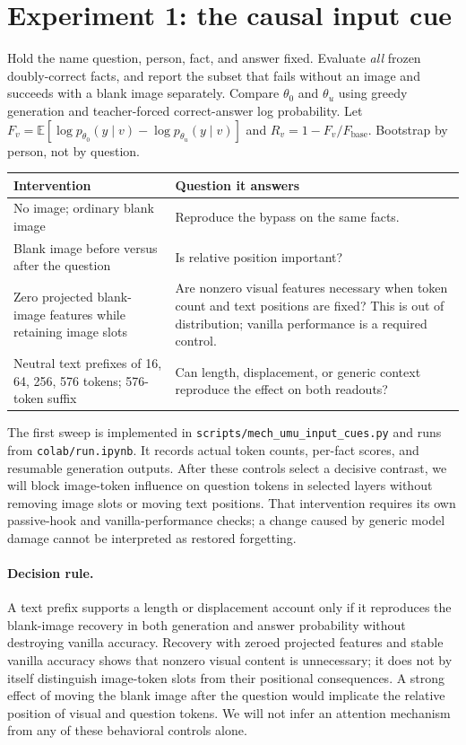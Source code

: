 \documentclass[11pt]{article}
\newcommand{\thu}{\theta_u}
\newcommand{\tho}{\theta_0}
\begin{document}
\section{Experiment 1: the causal input cue}
\label{sec:cue}
Hold the name question, person, fact, and answer fixed. Evaluate \emph{all} frozen
doubly-correct facts, and report the subset that fails without an image and succeeds
with a blank image separately. Compare $\tho$ and $\thu$ using greedy generation
and teacher-forced correct-answer log probability. Let
$F_v=\mathbb{E}[\log p_{\tho}(y\mid v)-\log p_{\thu}(y\mid v)]$ and
$R_v=1-F_v/F_{\mathrm{base}}$. Bootstrap by person, not by question.

\begin{center}\small
\begin{tabularx}{\linewidth}{@{}lX@{}}
\toprule
Intervention & Question it answers\\
\midrule
No image; ordinary blank image & Reproduce the bypass on the same facts.\\
Blank image before versus after the question & Is relative position important?\\
Zero projected blank-image features while retaining image slots & Are nonzero visual features necessary when token count and text positions are fixed? This is out of distribution; vanilla performance is a required control.\\
Neutral text prefixes of 16, 64, 256, 576 tokens; 576-token suffix & Can length, displacement, or generic context reproduce the effect on both readouts?\\
\bottomrule
\end{tabularx}
\end{center}
The first sweep is implemented in \texttt{scripts/mech\_umu\_input\_cues.py} and
runs from \texttt{colab/run.ipynb}. It records actual token counts, per-fact scores,
and resumable generation outputs. After these controls select a decisive contrast,
we will block image-token influence on question tokens in selected layers without
removing image slots or moving text positions. That intervention requires its own
passive-hook and vanilla-performance checks; a change caused by generic model damage
cannot be interpreted as restored forgetting.

\paragraph{Decision rule.} A text prefix supports a length or displacement account
only if it reproduces the blank-image recovery in both generation and answer probability
without destroying vanilla accuracy. Recovery with zeroed projected features and stable
vanilla accuracy shows that nonzero visual content is unnecessary; it does not by
itself distinguish image-token slots from their positional consequences. A strong
effect of moving the blank image after the question would implicate the relative
position of visual and question tokens. We will not infer an attention mechanism
from any of these behavioral controls alone.
\end{document}
